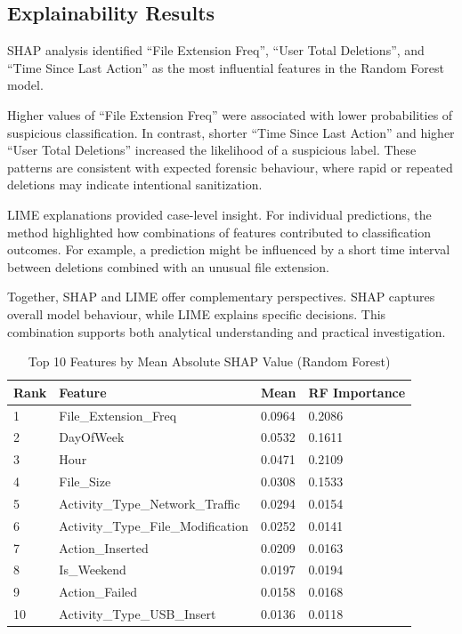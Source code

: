 \subsection{Explainability Results}
SHAP analysis identified “File Extension Freq”, “User Total Deletions”, and “Time Since Last Action” as the most influential features in the Random Forest model.

Higher values of “File Extension Freq” were associated with lower probabilities of suspicious classification. In contrast, shorter “Time Since Last Action” and higher “User Total Deletions” increased the likelihood of a suspicious label. These patterns are consistent with expected forensic behaviour, where rapid or repeated deletions may indicate intentional sanitization.

LIME explanations provided case-level insight. For individual predictions, the method highlighted how combinations of features contributed to classification outcomes. For example, a prediction might be influenced by a short time interval between deletions combined with an unusual file extension.

Together, SHAP and LIME offer complementary perspectives. SHAP captures overall model behaviour, while LIME explains specific decisions. This combination supports both analytical understanding and practical investigation.




\begin{table}
\centering
\caption{Top 10 Features by Mean Absolute SHAP Value (Random Forest)}
\label{tab:10rf}

\begin{tabular}{| l | l | l | l |}
\hline
\textbf{Rank} & \textbf{Feature} & \textbf{Mean} & \textbf{RF Importance} \\
\hline
1 & File\_Extension\_Freq & 0.0964 & 0.2086 \\
\hline
2 & DayOfWeek & 0.0532 & 0.1611 \\
\hline
3 & Hour & 0.0471 & 0.2109 \\
\hline
4 & File\_Size & 0.0308 & 0.1533 \\
\hline
5 & Activity\_Type\_Network\_Traffic & 0.0294 & 0.0154 \\
\hline
6 & Activity\_Type\_File\_Modification & 0.0252 & 0.0141 \\
\hline
7 & Action\_Inserted & 0.0209 & 0.0163 \\
\hline
8 & Is\_Weekend & 0.0197 & 0.0194 \\
\hline
9 & Action\_Failed & 0.0158 & 0.0168 \\
\hline
10 & Activity\_Type\_USB\_Insert & 0.0136 & 0.0118 \\
\hline

\end{tabular}

\end{table}


